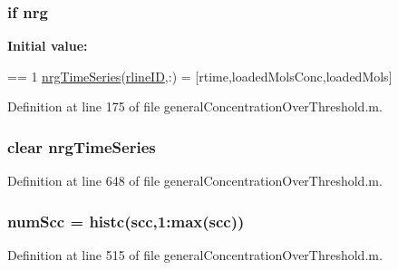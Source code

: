 \hypertarget{a00028_af837f695e5b67c86016c1a82608c38b4}{
\subsubsection[{nrg}]{ {\bf if} nrg}}\label{a00028_af837f695e5b67c86016c1a82608c38b4}
{\bfseries Initial value\+:}
\begin{DoxyCode}
== 1
                    \hyperlink{a00028_ad5f4092827ae220bd7c53532aaaa0590}{nrgTimeSeries}(\hyperlink{a00028_a8443a49765859a8631fed7e8a1d27fe5}{rlineID},:) = [rtime,loadedMolsConc,loadedMols]
\end{DoxyCode}


Definition at line 175 of file general\+Concentration\+Over\+Threshold.\+m.

\hypertarget{a00028_ad5f4092827ae220bd7c53532aaaa0590}{
\subsubsection[{nrg\+Time\+Series}]{\setlength{\rightskip}{0pt plus 5cm}clear nrg\+Time\+Series}}\label{a00028_ad5f4092827ae220bd7c53532aaaa0590}


Definition at line 648 of file general\+Concentration\+Over\+Threshold.\+m.

\hypertarget{a00028_a0d0db21d4520f7561ff56e2c80e4fb69}{
\subsubsection[{num\+Scc}]{\setlength{\rightskip}{0pt plus 5cm}num\+Scc = histc(scc,1\+:{\bf max}(scc))}}\label{a00028_a0d0db21d4520f7561ff56e2c80e4fb69}


Definition at line 515 of file general\+Concentration\+Over\+Threshold.\+m.

